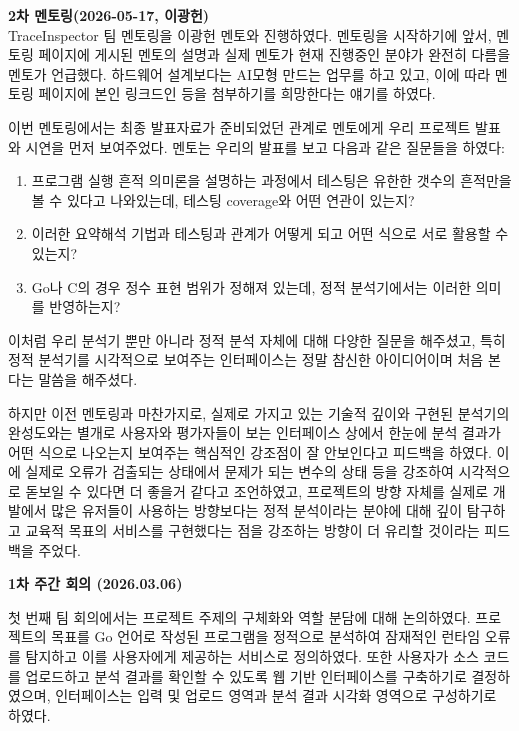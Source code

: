 \documentclass[a4paper,12pt]{article}
\begin{document}
\clearpage

\textbf{\large 2차 멘토링(2026-05-17, 이광헌)} ~\\

TraceInspector 팀 멘토링을 이광헌 멘토와 진행하였다. 멘토링을 시작하기에 앞서, 멘토링 페이지에 게시된 멘토의 설명과 실제 멘토가 현재 진행중인 분야가 완전히 다름을 멘토가 언급했다. 하드웨어 설계보다는 AI모형 만드는 업무를 하고 있고, 이에 따라 멘토링 페이지에 본인 링크드인 등을 첨부하기를 희망한다는 얘기를 하였다.

이번 멘토링에서는 최종 발표자료가 준비되었던 관계로 멘토에게 우리 프로젝트 발표와 시연을 먼저 보여주었다. 멘토는 우리의 발표를 보고 다음과 같은 질문들을 하였다:
\begin{enumerate}
    \item 프로그램 실행 흔적 의미론을 설명하는 과정에서 테스팅은 유한한 갯수의 흔적만을 볼 수 있다고 나와있는데, 테스팅 coverage와 어떤 연관이 있는지?
    \item 이러한 요약해석 기법과 테스팅과 관계가 어떻게 되고 어떤 식으로 서로 활용할 수 있는지?
    \item Go나 C의 경우 정수 표현 범위가 정해져 있는데, 정적 분석기에서는 이러한 의미를 반영하는지?
\end{enumerate}

이처럼 우리 분석기 뿐만 아니라 정적 분석 자체에 대해 다양한 질문을 해주셨고, 특히 정적 분석기를 시각적으로 보여주는 인터페이스는 정말 참신한 아이디어이며 처음 본다는 말씀을 해주셨다. 

하지만 이전 멘토링과 마찬가지로, 실제로 가지고 있는 기술적 깊이와 구현된 분석기의 완성도와는 별개로 사용자와 평가자들이 보는 인터페이스 상에서 한눈에 분석 결과가 어떤 식으로 나오는지 보여주는 핵심적인 강조점이 잘 안보인다고 피드백을 하였다. 이에 실제로 오류가 검출되는 상태에서 문제가 되는 변수의 상태 등을 강조하여 시각적으로 돋보일 수 있다면 더 좋을거 같다고 조언하였고, 프로젝트의 방향 자체를 실제로 개발에서 많은 유저들이 사용하는 방향보다는 정적 분석이라는 분야에 대해 깊이 탐구하고 교육적 목표의 서비스를 구현했다는 점을 강조하는 방향이 더 유리할 것이라는 피드백을 주었다.

\clearpage



\textbf{\large 1차 주간 회의 (2026.03.06)}

첫 번째 팀 회의에서는 프로젝트 주제의 구체화와 역할 분담에 대해 논의하였다. 프로젝트의 목표를 Go 언어로 작성된 프로그램을 정적으로 분석하여 잠재적인 런타임 오류를 탐지하고 이를 사용자에게 제공하는 서비스로 정의하였다. 또한 사용자가 소스 코드를 업로드하고 분석 결과를 확인할 수 있도록 웹 기반 인터페이스를 구축하기로 결정하였으며, 인터페이스는 입력 및 업로드 영역과 분석 결과 시각화 영역으로 구성하기로 하였다.
\end{document}
